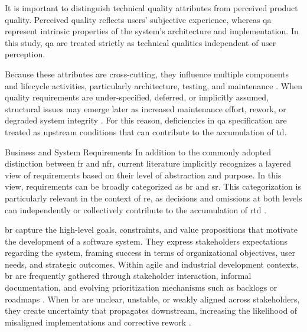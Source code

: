 \documentclass[12pt,reqno, twoside]{amsbook}
\makeatletter
\def\subsection{\@startsection{subsection}{2}%
      \z@{.5\linespacing\@plus.7\linespacing}{.25\linespacing}%
      {\normalfont\bfseries\flushleft}}
\theoremstyle{plain}
\numberwithin{equation}{chapter}
\numberwithin{section}{chapter}
\makeatother
\begin{document}
It is important to distinguish technical quality attributes from perceived product quality. 
Perceived quality reflects users’ subjective experience, whereas \gls{qa} represent intrinsic 
properties of the system’s architecture and implementation. In this study, \gls{qa} are treated 
strictly as technical qualities independent of user perception.

Because these attributes are cross-cutting, they influence multiple components and lifecycle 
activities, particularly architecture, testing, and maintenance \parencite{SWEBOK2024}. When 
quality requirements are under-specified, deferred, or implicitly assumed, structural issues may 
emerge later as increased maintenance effort, rework, or degraded system integrity 
\parencite{Rios2019, Melo2022}. For this reason, deficiencies in \gls{qa} specification are treated 
as upstream conditions that can contribute to the accumulation of \gls{td}.

\subsection{Business and System Requirements}
\noindent In addition to the commonly adopted distinction between \gls{fr} and \gls{nfr}, current literature implicitly 
recognizes a layered view of requirements based on their level of abstraction and purpose. In this view, requirements can 
be broadly categorized as \gls{br} and \gls{sr}. This categorization is particularly relevant in the context of \gls{re}, 
as decisions and omissions at both levels can independently or collectively contribute to the accumulation of \gls{rtd} 
\parencite{Melo2022,Lenarduzzi2019}.

\gls{br} capture the high-level goals, constraints, and value propositions that motivate the development of a software 
system. They express stakeholders expectations regarding the system, framing success in terms of organizational objectives, 
user needs, and strategic outcomes. Within agile and industrial development contexts, \gls{br} are frequently gathered 
through stakeholder interaction, informal documentation, and evolving prioritization mechanisms such as backlogs or 
roadmaps \parencite{Gralha2018,Behutiye2022}. When \gls{br} are unclear, unstable, or weakly aligned across stakeholders, 
they create uncertainty that propagates downstream, increasing the likelihood of misaligned implementations and 
corrective rework \parencite{Seyff2018,Melo2022}.
\end{document}
